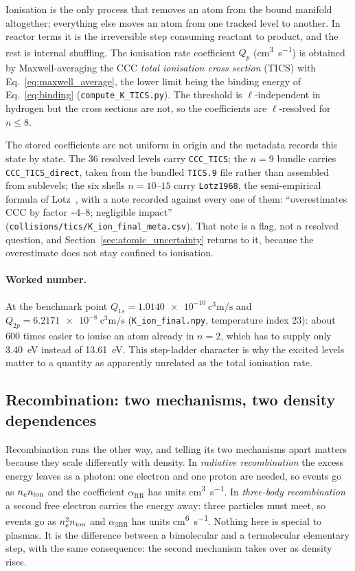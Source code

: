 Ionisation is the only process that removes an atom from the bound manifold
altogether; everything else moves an atom from one tracked level to another. In
reactor terms it is the irreversible step consuming reactant to product, and the
rest is internal shuffling. The ionisation rate coefficient $Q_p$
(\si{\cubic\centi\metre\per\second}) is obtained by Maxwell-averaging the CCC
\emph{total ionisation cross section} (TICS) with
Eq.~\eqref{eq:maxwell_average}, the lower limit being the binding energy of
Eq.~\eqref{eq:binding} (\texttt{compute\_K\_TICS.py}). The threshold is
$\ell$-independent in hydrogen but the cross sections are not, so the
coefficients are $\ell$-resolved for $n \le 8$.

The stored coefficients are not uniform in origin and the metadata records this
state by state. The 36 resolved levels carry \texttt{CCC\_TICS}; the $n=9$
bundle carries \texttt{CCC\_TICS\_direct}, taken from the bundled
\texttt{TICS.9} file rather than assembled from sublevels; the six shells
$n=10$--$15$ carry \texttt{Lotz1968}, the semi-empirical formula of
Lotz~\cite{Lotz1968}, with a note recorded against every one of them:
``overestimates CCC by factor \textasciitilde4--8; negligible impact''
(\texttt{collisions/tics/K\_ion\_final\_meta.csv}). That note is a flag, not
a resolved question, and Section~\ref{sec:atomic_uncertainty} returns to it,
because the overestimate does not stay confined to ionisation.

\paragraph{Worked number.} At the benchmark point
$Q_{1s} = \SI{1.0140e-10}{\cubic\centi\metre\per\second}$ and
$Q_{2p} = \SI{6.2171e-8}{\cubic\centi\metre\per\second}$
(\texttt{K\_ion\_final.npy}, temperature index 23): about 600 times easier to
ionise an atom already in $n=2$, which has to supply only
\SI{3.40}{\electronvolt} instead of \SI{13.61}{\electronvolt}. This step-ladder
character is why the excited levels matter to a quantity as apparently unrelated
as the total ionisation rate.

\subsection{Recombination: two mechanisms, two density dependences}

Recombination runs the other way, and telling its two mechanisms apart matters
because they scale differently with density. In \emph{radiative recombination}
the excess energy leaves as a photon: one electron and one proton are needed, so
events go as $n_en_{\mathrm{ion}}$ and the coefficient $\alpha_{\mathrm{RR}}$ has units
\si{\cubic\centi\metre\per\second}. In \emph{three-body recombination} a second
free electron carries the energy away: three particles must meet, so events go
as $n_e^{2}n_{\mathrm{ion}}$ and $\alpha_{\mathrm{3BR}}$ has units
\si{\centi\metre\tothe{6}\per\second}. Nothing here is special to plasmas. It is
the difference between a bimolecular and a termolecular elementary step, with
the same consequence: the second mechanism takes over as density rises.

